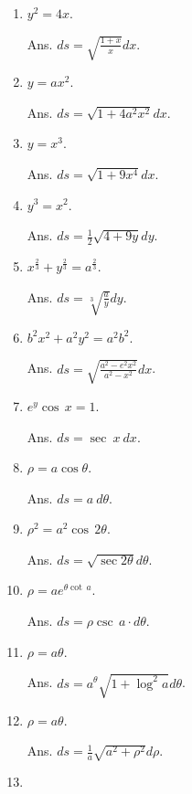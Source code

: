\begin{enumerate}

\item
$y^2 = 4x$. 	

Ans. 	$ds = \sqrt{\frac{1 + x}{x}}dx$.

\item
$y = ax^2$. 

Ans. $ds = \sqrt{1 + 4a^2 x^2}dx$.

\item
$y = x^3$. 

Ans. $ds = \sqrt{1 + 9x^4}dx$.

\item
$y^3 = x^2$.

Ans. $ds = \frac{1}{2}\sqrt{4 + 9y}dy$.

\item
$x^{\frac{2}{3}} + y^{\frac{2}{3}} = a^{\frac{2}{3}}$.

Ans. $ds = \sqrt[3]{\frac{a}{y}} dy$.

\item
$b^2x^2 + a^2y^2 = a^2b^2$. 

Ans. $ds = \sqrt{\frac{a^2 - e^2 x^2}{a^2 - x^2}} dx$.

\item
$e^y\cos\, x = 1$.

Ans. $ds = \sec\ x\ dx$.

\item
$\rho  = a\cos\theta$.

Ans. $ds = a\ d\theta$.

\item
$\rho^2 = a^2\cos\, 2\theta$. 

Ans. $ds = \sqrt{\sec 2\theta} d\theta$.

\item
$\rho = ae^{\theta \cot\, a}$. 	

Ans. $ds = \rho\csc\, a\cdot d\theta$.

\item
$\rho = a\theta$. 

Ans. $ds = a^{\theta} \sqrt{1 + \log^2 a} d\theta$.

\item
$\rho = a\theta$. 	

Ans. $ds = \frac{1}{a} \sqrt{a^2 + \rho^2} d\rho$.

\item


\end{enumerate}
